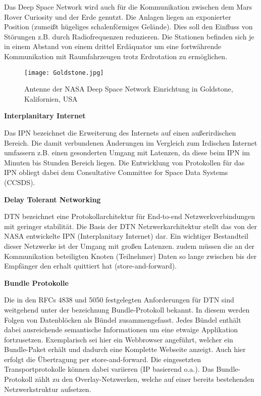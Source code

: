 Das Deep Space Network wird auch f{\"u}r die Kommunikation zwischen dem Mars
Rover Curiosity und der Erde genutzt. Die Anlagen liegen an exponierter Position
(zumei{\ss}t h{\"u}geliges schalenf{\"o}rmiges Gel{\"a}nde). Dies soll den
Einfluss von St{\"o}rungen z.B. durch Radiofrequenzen reduzieren. Die Stationen
befinden sich je in einem Abstand von einem drittel Erd{\"a}quator um eine
fortw{\"a}hrende Kommunikation mit Raumfahrzeugen trotz Erdrotation zu
erm{\"o}glichen.

\begin{figure}[H]
\centering
\texttt{[image: Goldstone.jpg]}
\caption{Antenne der NASA Deep Space Network Einrichtung in Goldstone,
Kalifornien, USA}
\label{fig:Goldstone}
\end{figure}

\textbf{Interplanitary Internet}

Das IPN bezeichnet die Erweiterung des Internets auf einen au{\ss}erirdischen
Bereich. Die damit verbundenen {\"A}nderungen im Vergleich zum Irdischen
Internet umfassern z.B. einen gesonderten Umgang mit Latenzen, da diese beim IPN
im Minuten bis Stunden Bereich liegen. Die Entwicklung von Protokollen
f{\"u}r das IPN obliegt dabei dem Consultative Committee for Space Data Systems
(CCSDS).

\textbf{Delay Tolerant Networking}

DTN bezeichnet eine Protokollarchitektur f{\"u}r End-to-end Netzwerkverbindungen
mit geringer stabilit{\"a}t. Die Basis der DTN Netzwerkarchitektur stellt das
von der NASA entwickelte IPN (Interplanitary Internet) dar. Ein wichtiger
Bestandteil dieser Netzwerke ist der Umgang mit gro{\ss}en Latenzen. zudem
m{\"u}ssen die an der Kommunikation beteiligten Knoten (Teilnehmer) Daten so
lange zwischen bis der Empf{\"a}nger den erhalt quittiert hat
(store-and-forward).

\textbf{Bundle Protokolle}

Die in den RFCs 4838 und 5050 festgelegten Anforderungen f{\"u}r DTN sind
weitgehend unter der bezeichnung Bundle-Protokoll bekannt. In diesem werden Folgen von
Datenbl{\"o}cken als B{\"u}ndel zusammengefasst. Jedes B{\"u}ndel enth{\"a}lt
dabei ausreichende semantische Informationen um eine etwaige Applikation
fortzusetzen. Exemplarisch sei hier ein Webbrowser angef{\"u}hrt, welcher ein
Bundle-Paket erh{\"a}lt und dadurch eine Komplette Webseite anzeigt. Auch hier
erfolgt die {\"U}bertragung per store-and-forward. Die eingesetzten
Transportprotokolle k{\"o}nnen dabei variieren (IP basierend o.a.). Das
Bundle-Protokoll z{\"a}hlt zu den Overlay-Netzwerken, welche auf einer bereits
bestehenden Netzwerkstruktur aufsetzen.










